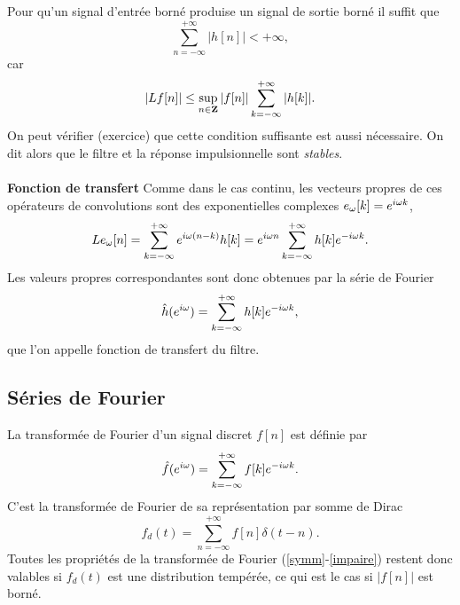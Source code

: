 Pour qu'un signal
d'entr\'ee born\'e produise un signal de sortie born\'e il suffit que
\begin{equation}
\sum_{n=- \infty}^{+ \infty} |h [ n  ]| < + \infty ,
\end{equation}
car
\[
|Lf[n]| \leq \sup_{n \in {\bf{Z}}} |f[n]|
\sum_{k=- \infty}^{+ \infty} |h [ k  ]| .
\]
On peut v\'erifier (exercice) que cette condition suffisante
est aussi n\'ecessaire.
On dit alors que le filtre et la r\'eponse impulsionnelle
sont {\it stables}.
\\
\\
{\bf Fonction de transfert}
Comme dans le cas continu, les vecteurs propres de ces
op\'erateurs de convolutions sont des exponentielles complexes
$e_{\omega}[k] = e^{i{\omega} k}$,
\begin{equation}
L e_{\omega} [n] = \sum_{k=- \infty}^{+ \infty}
e^{i{\omega} (n-k)} h [k] =
e^{i {\omega} n} \sum_{k=- \infty}^{+ \infty} h[k] e^{-i {\omega} k} .
\end{equation}
Les valeurs propres correspondantes sont donc obtenues
par la s\'erie de Fourier
\begin{equation}
\hat h ( e^{i {\omega}} ) = \sum_{k=- \infty}^{+ \infty} h[k] e^{-i{\omega} k} ,
\end{equation}
que l'on appelle fonction de transfert du filtre.

\subsection{S\'eries de Fourier}

La transform\'ee de Fourier d'un signal discret $f[n]$
est d\'efinie par
\begin{equation}
\label{serie-Fourier}
\hat f ( e^{i {\omega}} ) = \sum_{k=- \infty}^{+ \infty} f[k] e^{-i{\omega} k} .
\end{equation}
C'est la transform\'ee de Fourier de sa repr\'esentation
par somme de Dirac
\[
f_d (t) = \sum_{n=- \infty} ^{+ \infty} f[n] \delta (t -n) .
\]
Toutes les propri\'et\'es de la transform\'ee de Fourier
(\ref{symm}-\ref{impaire})
restent donc valables
si $f_d (t)$ est une distribution temp\'er\'ee,
ce qui est le cas si $|f[n]|$ est born\'e.

